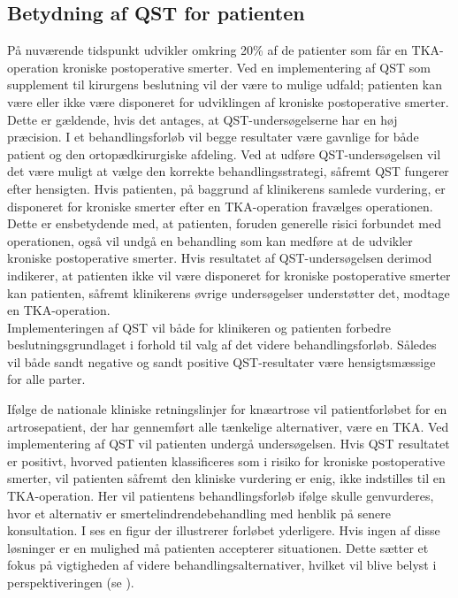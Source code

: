 \subsection{Betydning af QST for patienten}
På nuværende tidspunkt udvikler omkring 20\% af de patienter som får en TKA-operation kroniske postoperative smerter. Ved en implementering af QST som supplement til kirurgens beslutning vil der være to mulige udfald; patienten kan være eller ikke være disponeret for udviklingen af kroniske postoperative smerter. Dette er gældende, hvis det antages, at QST-undersøgelserne har en høj præcision. I et behandlingsforløb vil begge resultater være gavnlige for både patient og den ortopædkirurgiske afdeling. Ved at udføre QST-undersøgelsen vil det være muligt at vælge den korrekte behandlingsstrategi, såfremt QST fungerer efter hensigten. Hvis patienten, på baggrund af klinikerens samlede vurdering, er disponeret for kroniske smerter efter en TKA-operation fravælges operationen. Dette er ensbetydende med, at patienten, foruden generelle risici forbundet med operationen, også vil undgå en behandling som kan medføre at de udvikler kroniske postoperative smerter. Hvis resultatet af QST-undersøgelsen derimod indikerer, at patienten ikke vil være disponeret for kroniske postoperative smerter kan patienten, såfremt klinikerens øvrige undersøgelser understøtter det, modtage en TKA-operation. \\
Implementeringen af QST vil både for klinikeren og patienten forbedre beslutningsgrundlaget i forhold til valg af det videre behandlingsforløb. Således vil både sandt negative og sandt positive QST-resultater være hensigtsmæssige for alle parter.


Ifølge de nationale kliniske retningslinjer for knæartrose vil patientforløbet for en artrosepatient, der har gennemført alle tænkelige alternativer, være en TKA. \citep{brostrom2012} Ved implementering af QST vil patienten undergå undersøgelsen. Hvis QST resultatet er positivt, hvorved patienten klassificeres som i risiko for kroniske postoperative smerter, vil patienten såfremt den kliniske vurdering er enig, ikke indstilles til en TKA-operation. Her vil patientens behandlingsforløb ifølge  skulle genvurderes, hvor et alternativ er smertelindrendebehandling med henblik på senere konsultation. I  ses en figur der illustrerer forløbet yderligere. Hvis ingen af disse løsninger er en mulighed må patienten accepterer situationen. Dette sætter et fokus på vigtigheden af videre behandlingsalternativer, hvilket vil blive belyst i perspektiveringen (se ). 

